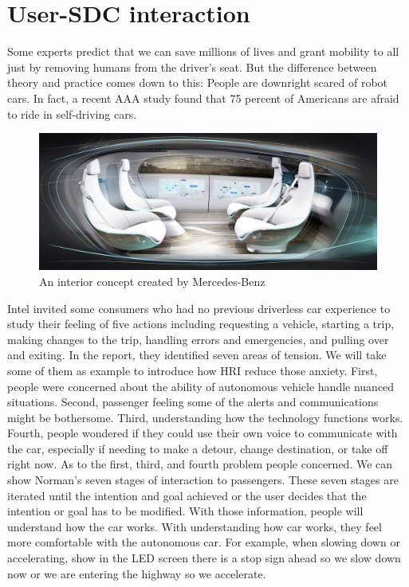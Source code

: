\documentclass[a4paper, 10pt, conference]{ieeeconf}      %
\begin{document}
\section{User-SDC interaction}

Some experts predict that we can save millions of lives and grant mobility to all just by removing humans from the driver’s seat. But the difference between theory and practice comes down to this: People are downright scared of robot cars. In fact, a recent AAA study found that 75 percent of Americans are afraid to ride in self-driving cars\cite{wwybr}.
\begin{figure}
    \centering
    \includegraphics[scale=0.1]{selfdrivingcar.jpeg}
    \caption{An interior concept created by Mercedes-Benz}
    \label{self-driving-car}
\end{figure}
Intel invited some consumers who had no previous driverless car experience to study their feeling of five actions including requesting a vehicle, starting a trip, making changes to the trip, handling errors and emergencies, and pulling over and exiting. In the report, they identified seven areas of tension. We will take some of them as example to introduce how HRI reduce those anxiety. First, people were concerned about the ability of autonomous vehicle handle nuanced situations. Second, passenger feeling some of the alerts and communications might be bothersome. Third, understanding how the technology functions works. Fourth, people wondered if they could use their own voice to communicate with the car, especially if needing to make a detour, change destination, or take off right now. As to the first, third, and fourth problem people concerned. We can show Norman’s seven stages of interaction\cite{cednsd} to passengers. These seven stages are iterated until the intention and goal achieved or the user decides that the intention or goal has to be modified\cite{tehri}. With those information, people will understand how the car works. With understanding how car works, they feel more comfortable with the autonomous car. For example, when slowing down or accelerating, show in the LED screen there is a stop sign ahead so we slow down now or we are entering the highway so we accelerate.
\end{document}
